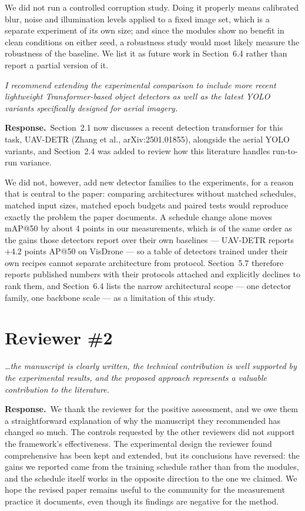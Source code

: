 \documentclass[11pt, a4paper]{article}
\newcommand{\point}[1]{\medskip\noindent\textit{#1}\par}
\newcommand{\reply}{\textbf{Response.}\ }
\begin{document}
We did not run a controlled corruption study. Doing it properly means calibrated
blur, noise and illumination levels applied to a fixed image set, which is a
separate experiment of its own size; and since the modules show no benefit in
clean conditions on either seed, a robustness study would most likely measure the
robustness of the baseline. We list it as future work in Section~6.4 rather than
report a partial version of it.

\point{I recommend extending the experimental comparison to include more recent
lightweight Transformer-based object detectors as well as the latest YOLO variants
specifically designed for aerial imagery.}

\reply Section~2.1 now discusses a recent detection transformer for this task,
UAV-DETR (Zhang et al., arXiv:2501.01855), alongside the aerial YOLO variants, and
Section~2.4 was added to review how this literature handles run-to-run variance.

We did not, however, add new detector families to the experiments, for a reason
that is central to the paper: comparing architectures without matched schedules,
matched input sizes, matched epoch budgets and paired tests would reproduce
exactly the problem the paper documents. A schedule change alone moves mAP@50 by
about 4 points in our measurements, which is of the same order as the gains those
detectors report over their own baselines --- UAV-DETR reports $+4.2$ points AP@50
on VisDrone --- so a table of detectors trained under their own recipes cannot
separate architecture from protocol. Section~5.7 therefore reports published
numbers with their protocols attached and explicitly declines to rank them, and
Section~6.4 lists the narrow architectural scope --- one detector family, one
backbone scale --- as a limitation of this study.

\section*{Reviewer \#2}

\point{\dots the manuscript is clearly written, the technical contribution is
well supported by the experimental results, and the proposed approach represents a
valuable contribution to the literature.}

\reply We thank the reviewer for the positive assessment, and we owe them a
straightforward explanation of why the manuscript they recommended has changed so
much. The controls requested by the other reviewers did not support the
framework's effectiveness. The experimental design the reviewer found
comprehensive has been kept and extended, but its conclusions have reversed: the
gains we reported came from the training schedule rather than from the modules,
and the schedule itself works in the opposite direction to the one we claimed. We
hope the revised paper remains useful to the community for the measurement
practice it documents, even though its findings are negative for the method.
\end{document}
